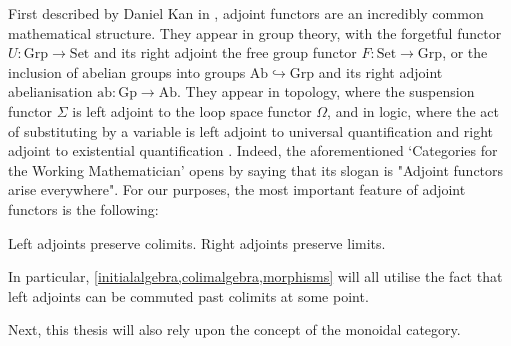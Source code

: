 First described by Daniel Kan in \cite{adjoint}, adjoint functors are an incredibly common mathematical structure. They appear in group theory, with the forgetful functor $U: \mathrm{Grp} \to \mathrm{Set}$ and its right adjoint the free group functor $F: \mathrm{Set} \to \mathrm{Grp}$, or the inclusion of abelian groups into groups $\mathrm{Ab} \hookrightarrow \mathrm{Grp}$ and its right adjoint abelianisation $\mathrm{ab}: \mathrm{Gp} \to \mathrm{Ab}$. They appear in topology, where the suspension functor $\Sigma$ is left adjoint to the loop space functor $\Omega$, and in logic, where the act of substituting by a variable is left adjoint to universal quantification and right adjoint to existential quantification \cite{aif}. Indeed, the aforementioned `Categories for the Working Mathematician' \cite{cwm} opens by saying that its slogan is "Adjoint functors arise everywhere". For our purposes, the most important feature of adjoint functors is the following:

\begin{prop} Left adjoints preserve colimits. Right adjoints preserve limits. \end{prop}

In particular, \cref{initialalgebra,colimalgebra,morphisms} will all utilise the fact that left adjoints can be commuted past colimits at some point.

Next, this thesis will also rely upon the concept of the monoidal category.

